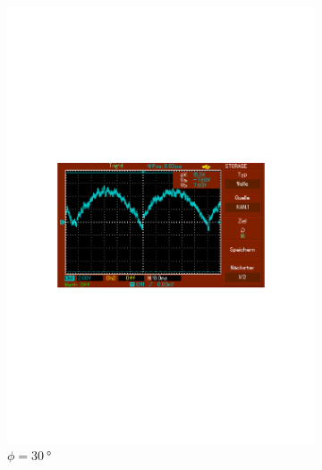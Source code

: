 \begin{figure}
\begin{subfigure}{0.3\textwidth}
      \includegraphics[width=\textwidth]{Daten/Noise/30.pdf}
      \caption{$\phi = \SI{30}{\degree}$}
      \label{fig:30n}
  \end{subfigure}
  \begin{subfigure}{0.3\textwidth}
      \centering

\end{subfigure}
\end{figure}

